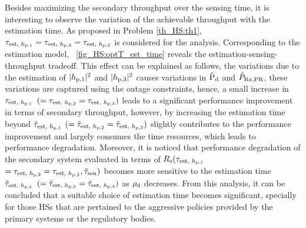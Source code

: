 Besides maximizing the secondary throughput over the sensing time, it is interesting to observe the variation of the achievable throughput with the estimation time.
As proposed in Problem \ref{th_HS:th1}, $\tau_{\text{est, $h_{\text{p,1}}$}} = \tau_{\text{est, $h_{\text{p,2}}$}} = \tau_{\text{est, $h_{\text{p,3}}$}}$ is considered for the analysis. Corresponding to the estimation model, \figurename~\ref{fig_HS:optT_est_time} reveals the estimation-sensing-throughput tradeoff. This effect can be explained as follows, the variations due to the estimation of $|h_{\text{p,1}}|^2$ and $|h_{\text{p,3}}|^2$ causes variations in $\hat{\text{P}}_{\text{d}}$ and $\hat{P}_{\text{Rx,PR}}$, these variations are captured using the outage constraints, hence, a small increase in $\tau_{\text{est, $h_{\text{p,1}}$}}$ $(= \tau_{\text{est, $h_{\text{p,2}}$}} = \tau_{\text{est, $h_{\text{p,3}}$}})$ leads to a significant performance improvement in terms of secondary throughput, however, by increasing the estimation time beyond $\tilde{\tau}_{\text{est, $h_{\text{p,1}}$}}$ $(= \tilde{\tau}_{\text{est, $h_{\text{p,2}}$}}= \tilde{\tau}_{\text{est, $h_{\text{p,3}}$}})$ slightly contributes to the performance improvement and largely consumes the time resources, which leads to performance degradation. Moreover, it is noticed that performance degradation of the secondary system evaluated in terms of $R_{\text{s}}(\tau_{\text{est, $h_{\text{p,1}}$}}$ $= \tau_{\text{est, $h_{\text{p,2}}$}} = \tau_{\text{est, $h_{\text{p,3}}$}}, \tilde{\tau}_{\text{sen}})$ becomes more sensitive to the estimation time $\tilde{\tau}_{\text{est, $h_{\text{p,1}}$}}$ $(= \tilde{\tau}_{\text{est, $h_{\text{p,2}}$}}= \tilde{\tau}_{\text{est, $h_{\text{p,3}}$}})$ as $\rho_{\text{d}}$ decreases. From this analysis, it can be concluded that a suitable choice of estimation time becomes significant, specially for those HSs that are pertained to the aggressive policies provided by the primary systems or the regulatory bodies. 


